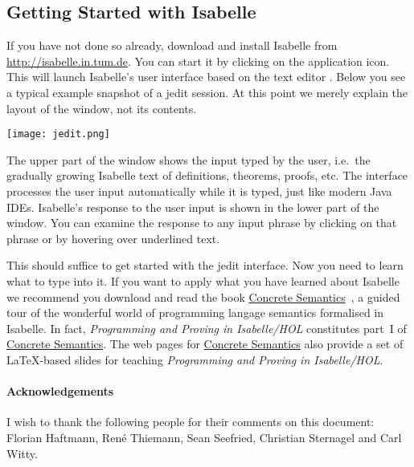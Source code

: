 \ifsem
\subsection*{Getting Started with Isabelle}

If you have not done so already, download and install Isabelle
from \url{http://isabelle.in.tum.de}. You can start it by clicking
on the application icon. This will launch Isabelle's
user interface based on the text editor . Below you see
a typical example snapshot of a jedit session. At this point we merely explain
the layout of the window, not its contents.

\begin{center}
\texttt{[image: jedit.png]}
\end{center}
The upper part of the window shows the input typed by the user, i.e.\ the
gradually growing Isabelle text of definitions, theorems, proofs, etc.  The
interface processes the user input automatically while it is typed, just like
modern Java IDEs.  Isabelle's response to the user input is shown in the
lower part of the window. You can examine the response to any input phrase
by clicking on that phrase or by hovering over underlined text.

This should suffice to get started with the jedit interface.
Now you need to learn what to type into it.
\else
If you want to apply what you have learned about Isabelle we recommend you
download and read the book
\href{http://www.in.tum.de/~nipkow/Concrete/}{Concrete
Semantics}~\cite{ConcreteSemantics}, a guided tour of the wonderful world of
programming langage semantics formalised in Isabelle.  In fact,
\emph{Programming and Proving in Isabelle/HOL} constitutes part~I of
\href{http://www.in.tum.de/~nipkow/Concrete/}{Concrete Semantics}.  The web
pages for \href{http://www.in.tum.de/~nipkow/Concrete/}{Concrete Semantics}
also provide a set of \LaTeX-based slides for teaching \emph{Programming and
Proving in Isabelle/HOL}.
\fi

\ifsem\else
\paragraph{Acknowledgements}
I wish to thank the following people for their comments on this document:
Florian Haftmann, Ren\'{e} Thiemann, Sean Seefried, Christian Sternagel
and Carl Witty.
\fi